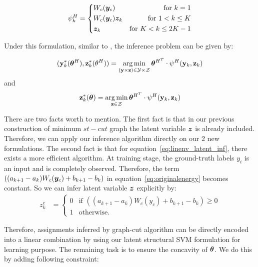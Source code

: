 \begin{equation}
\label{eq:llsvm_feature}
  \psi_k^H = \left\{
		\begin{aligned}
      & W_c({\bm{y}}_c) 	& \text{for} \ k=1\\
      & W_c({\bm{y}}_c){\bm{z}}_k & \text{for}\ 1<k\le K\\
      & {\bm{z}}_k & \text{for} \ K<k\le2K-1\\
		\end{aligned}
  \right.
\end{equation}

Under this formulation, similar to \cite{yu2009learning}, the inference problem
can be given by:

\begin{align}
  \label{eq:linenv_full_inf}
  (\mathbf{y}^*_k({\bm{\theta}}^H),\mathbf{z}^*_k(\theta^H))=\operatorname*{arg\,min}_{(\mathbf{y}
  \times \mathbf{z}) \in \mathcal{Y} \times \mathcal{Z}}
  {\bm{\theta}}^{H^T}\cdot\psi^H(\mathbf{y}_k,\mathbf{z}_k)
\end{align}
and
\begin{align}
  \label{eq:linenv_latent_inf}
  \mathbf{z}^*_k({\bm{\theta}}) = \operatorname*{arg\,min}_{\mathbf{z} \in \mathcal{Z}}
  {\bm{\theta}}^{H^T} \cdot \psi^H(\mathbf{y}_k,\mathbf{z}_k)
\end{align}

There are two facts worth to mention. The first fact is
that in our previous construction of minimum $st-cut$ graph the
latent variable ${\bm{z}}$ is already included. Therefore, we can
apply our inference algorithm directly on our 2 new formulations. The second fact is that for equation~\eqref{eq:linenv_latent_inf}, there exists a more efficient algorithm. At training stage, the ground-truth
labels $y_i$ is an input and is completely observed.
Therefore, the term $((a_{k+1}-a_k)W_c({\bm{y}}_c)+b_{k+1}-b_k)$ in
equation~\eqref{eq:originalenergy} becomes constant. So we can
infer latent variable ${\bm{z}}$ explicitly by:
\begin{align}
  \label{eq:linenv_effi_infer_latent}
  z_k^c &=
          \begin{cases}
            0 & \text{if $((a_{k+1}-a_k)W_c(y_c)+b_{k+1}-b_k)\geq0$} \\
            1 & \text{otherwise}.
          \end{cases}
\end{align}

Therefore, assignments inferred by graph-cut algorithm can be
directly encoded into a linear combination by using our latent
structural SVM formulation for learning purpose. The remaining
task is to ensure the concavity of ${\bm{\theta}}$. We do this by
adding following constraint:

